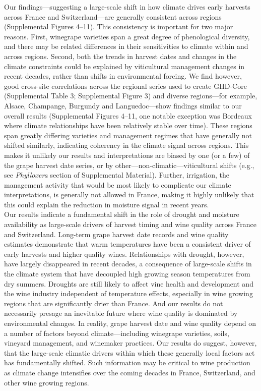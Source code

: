 \documentclass[final]{nature}
\begin{document}
\indent Our findings---suggesting a large-scale shift in how climate drives early harvests across France and Switzerland---are generally consistent across regions (Supplemental Figures 4--11).  This consistency is important for two major reasons. First, winegrape varieties span a great degree of phenological diversity, and there may be related differences in their sensitivities to climate\cite{Fila2015} within and across regions\cite{Parker2013}. Second, both the trends in harvest dates and changes in the climate constraints could be explained by viticultural management changes in recent decades, rather than shifts in environmental forcing. We find however, good cross-site correlations across the regional series used to create GHD-Core (Supplemental Table 3; Supplemental Figure 3) and diverse regions---for example, Alsace, Champange, Burgundy and Languedoc---show findings similar to our overall results (Supplemental Figures 4--11, one notable exception was Bordeaux where climate relationships have been relatively stable over time). These regions span greatly differing varieties and management regimes that have generally not shifted similarly, indicating coherency in the climate signal across regions. This makes it unlikely our results and interpretations are biased by one (or a few) of the grape harvest date series, or by other---non-climatic---viticultural shifts (e.g., see \emph{Phylloxera} section of Supplemental Material). Further, irrigation, the management activity that would be most likely to complicate our climate interpretations, is generally not allowed in France, making it highly unlikely that this could explain the reduction in moisture signal in recent years.\\
\indent Our results indicate a fundamental shift in the role of drought and moisture availability as large-scale drivers of harvest timing and wine quality across France and Switzerland. Long-term grape harvest date records and wine quality estimates demonstrate that warm temperatures have been a consistent driver of early harvests and higher quality wines. Relationships with drought, however, have largely disappeared in recent decades, a consequence of large-scale shifts in the climate system that have decoupled high growing season temperatures from dry summers. Droughts are still likely to affect vine health and development and the wine industry independent of temperature effects, especially in wine growing regions that are significantly drier than France\cite{VanLeeuwen2015,webb2012}. And our results do not necessarily presage an inevitable future where wine quality is dominated by environmental changes. In reality, grape harvest date and wine quality depend on a number of factors beyond climate---including winegrape varieties, soils, vineyard management, and winemaker practices\cite{Jackson1993,Leeuwen2013}. Our results do suggest, however, that the large-scale climatic drivers within which these generally local factors act has fundamentally shifted. Such information may be critical to wine production as climate change intensifies over the coming decades in France, Switzerland, and other wine growing regions.
\end{document}
